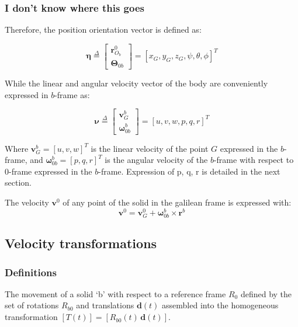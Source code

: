 \documentclass{article}
\begin{document}
{\color{blue} 
\subsubsection{I don't know where this goes}

Therefore, the position orientation vector is defined as:

\begin{equation}
\mathbf{\eta} \stackrel{\Delta}{=} 
\begin{bmatrix}
\textbf{r}_{O_b}^0 \\
\mathbf{\Theta}_{0b}
\end{bmatrix} 
=
[x_G,y_G,z_G,\psi,\theta,\phi]^T
\end{equation}

While the linear and angular velocity vector of the body are conveniently expressed in $b$-frame as:

\begin{equation}
\mathbf{\nu} \stackrel{\Delta}{=} 
\begin{bmatrix}
\textbf{v}_G^b \\
\mathbf{\omega}_{0b}^b
\end{bmatrix} 
=
[u,v,w,p,q,r]^T
\label{velocityvector}
\end{equation}

Where $\textbf{v}_{G}^b = [u,v,w]^T$ is the linear velocity of the point $G$ expressed in the $b$-frame, and $\mathbf{\omega}_{0b}^b = [p,q,r]^T$ is the angular velocity of the $b$-frame with respect to $0$-frame expressed in the $b$-frame.
Expression of p, q, r is detailed in the next section.

The velocity $\textbf{v}^0$ of any point of the solid in the galilean frame is expressed with:
\begin{equation}
\textbf{v}^0 = \textbf{v}_G^0  +   \mathbf{\omega}_{0b}^b \times \textbf{r}^b
\end{equation} 
}

\subsection{Velocity transformations}


\subsubsection{Definitions}
The movement of a solid `b' with respect to a reference frame  $R_0$ defined by the set of rotations $R_{b0}$ and translations $\textbf{d}(t)$ assembled into the homogeneous transformation $[T(t)]=[ R_{b0} (t) \,  \textbf{d}(t) ]$.  
\end{document}
